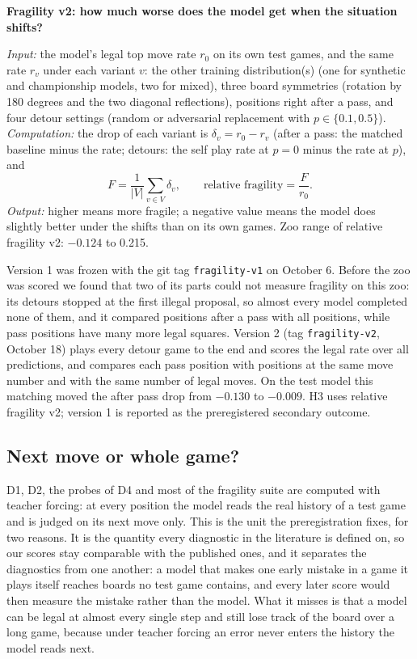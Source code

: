 \documentclass[11pt]{scrartcl}
\newenvironment{defbox}[1]{%
    \par\medskip\noindent
    \begin{lrbox}{\defboxcontent}%
    \begin{minipage}{\dimexpr\linewidth-2\fboxsep-2\fboxrule\relax}%
    \textbf{#1}\par\smallskip\small
}{%
    \end{minipage}%
    \end{lrbox}%
    \fbox{\usebox{\defboxcontent}}\par\medskip
}
\begin{document}
\begin{defbox}{Fragility v2: how much worse does the model get when the situation shifts?}
\textit{Input:} the model's legal top move rate $r_0$ on its own test games, and the same rate $r_v$ under
each variant $v$: the other training distribution(s) (one for synthetic and championship models, two for
mixed), three board symmetries (rotation by 180 degrees and the two diagonal reflections), positions right
after a pass, and four detour settings (random or adversarial replacement with $p\in\{0.1,0.5\}$).\\[2pt]
\textit{Computation:} the drop of each variant is $\delta_v=r_0-r_v$ (after a pass: the matched baseline
minus the rate; detours: the self play rate at $p=0$ minus the rate at $p$), and
\[
  F=\frac{1}{|V|}\sum_{v\in V}\delta_v,\qquad \text{relative fragility}=\frac{F}{r_0}.
\]
\textit{Output:} higher means more fragile; a negative value means the model does slightly better under the
shifts than on its own games. Zoo range of relative fragility v2: $-0.124$ to 0.215.
\end{defbox}

Version 1 was frozen with the git tag \texttt{fragility-v1} on October 6. Before the zoo was scored we found
that two of its parts could not measure fragility on this zoo: its detours stopped at the first illegal
proposal, so almost every model completed none of them, and it compared positions after a pass with all
positions, while pass positions have many more legal squares. Version 2 (tag \texttt{fragility-v2}, October
18) plays every detour game to the end and scores the legal rate over all predictions, and compares each pass
position with positions at the same move number and with the same number of legal moves. On the test model
this matching moved the after pass drop from $-0.130$ to $-0.009$. H3 uses relative fragility v2; version 1 is
reported as the preregistered secondary outcome.

\subsection{Next move or whole game?}
\label{sec:sequence_method}

D1, D2, the probes of D4 and most of the fragility suite are computed with teacher forcing: at every position
the model reads the real history of a test game and is judged on its next move only. This is the unit the
preregistration fixes, for two reasons. It is the quantity every diagnostic in the literature is defined on,
so our scores stay comparable with the published ones, and it separates the diagnostics from one another: a
model that makes one early mistake in a game it plays itself reaches boards no test game contains, and every
later score would then measure the mistake rather than the model. What it misses is that a model can be legal
at almost every single step and still lose track of the board over a long game, because under teacher forcing
an error never enters the history the model reads next.
\end{document}
